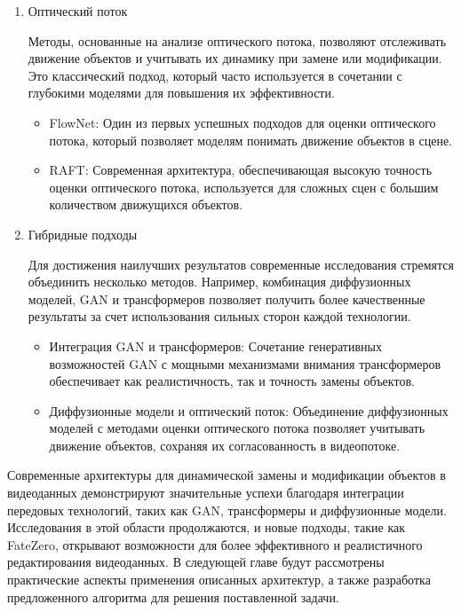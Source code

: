 \begin{enumerate}
\begin{itemize}
        \item Трансформеры для видео (Video Transformers): Адаптированные версии трансформеров, такие как TimeSformer, используют механизм внимания для анализа временных зависимостей между кадрами, сохраняя высокую точность обработки.
    \end{itemize}

    \item Оптический поток

    Методы, основанные на анализе оптического потока, позволяют отслеживать движение объектов и учитывать их динамику при замене или модификации. Это классический подход, который часто используется в сочетании с глубокими моделями для повышения их эффективности.

    \begin{itemize}
        \item FlowNet: Один из первых успешных подходов для оценки оптического потока, который позволяет моделям понимать движение объектов в сцене.

        \item RAFT: Современная архитектура, обеспечивающая высокую точность оценки оптического потока, используется для сложных сцен с большим количеством движущихся объектов.
    \end{itemize}

    \item Гибридные подходы
    
    Для достижения наилучших результатов современные исследования стремятся объединить несколько методов. Например, комбинация диффузионных моделей, GAN и трансформеров позволяет получить более качественные результаты за счет использования сильных сторон каждой технологии.

    \begin{itemize}
        \item Интеграция GAN и трансформеров: Сочетание генеративных возможностей GAN с мощными механизмами внимания трансформеров обеспечивает как реалистичность, так и точность замены объектов.

        \item Диффузионные модели и оптический поток: Объединение диффузионных моделей с методами оценки оптического потока позволяет учитывать движение объектов, сохраняя их согласованность в видеопотоке.
    \end{itemize}
\end{enumerate}

Современные архитектуры для динамической замены и модификации объектов в видеоданных демонстрируют значительные успехи благодаря интеграции передовых технологий, таких как GAN, трансформеры и диффузионные модели. Исследования в этой области продолжаются, и новые подходы, такие как FateZero, открывают возможности для более эффективного и реалистичного редактирования видеоданных. В следующей главе будут рассмотрены практические аспекты применения описанных архитектур, а также разработка предложенного алгоритма для решения поставленной задачи.



